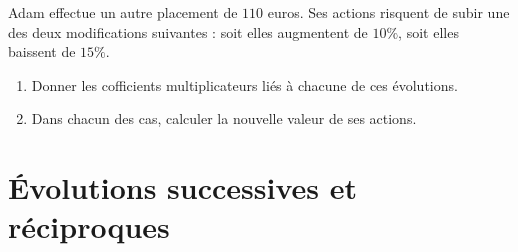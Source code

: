 \documentclass[11pt]{article}
\begin{document}
\begin{app}
  Adam effectue un autre placement de $110$ euros. Ses actions risquent de subir
  une des deux modifications suivantes : soit elles augmentent de $10\%$, soit
  elles baissent de $15\%$.
  \begin{enumerate}
    \item Donner les cofficients multiplicateurs liés à chacune de ces
      évolutions.
    \item Dans chacun des cas, calculer la nouvelle valeur de ses actions.
  \end{enumerate}
\end{app}

\section{Évolutions successives et réciproques}
\end{document}
